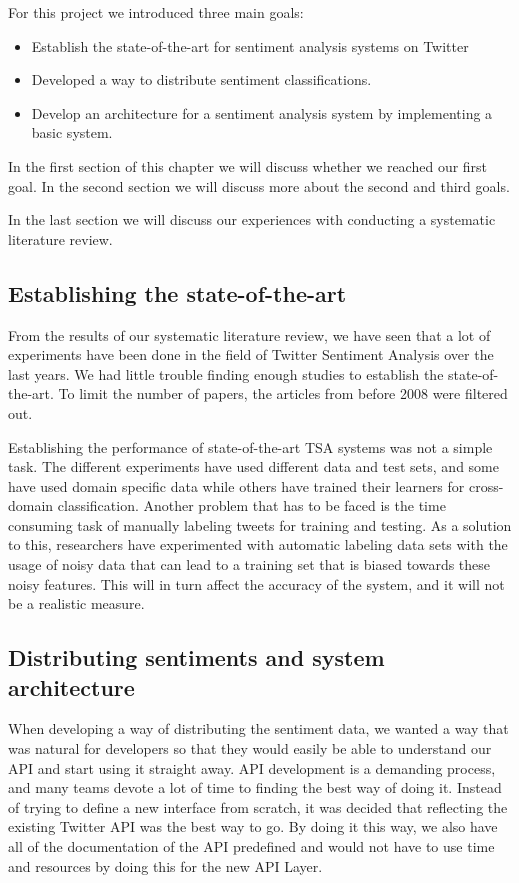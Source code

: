 
For this project we introduced three main goals:
\begin{itemize}
\item Establish the state-of-the-art for sentiment analysis systems on Twitter
\item Developed a way to distribute sentiment classifications.
\item Develop an architecture for a sentiment analysis system by implementing a basic system.
\end{itemize}

\noindent In the first section of this chapter we will discuss whether we reached our first goal. In the second section we will discuss more about the second and third goals. 

In the last section we will discuss our experiences with conducting a systematic literature review. 


\subsection{Establishing the state-of-the-art}
From the results of our systematic literature review, we have seen that a lot of experiments have been done in the field of Twitter Sentiment Analysis over the last years. We had little trouble finding enough studies to establish the state-of-the-art. To limit the number of papers, the articles from before 2008 were filtered out.

Establishing the performance of state-of-the-art TSA systems was not a simple task. The different experiments have used different data and test sets, and some have used domain specific data while others have trained their learners for cross-domain classification. Another problem that has to be faced is the time consuming task of manually labeling tweets for training and testing. As a solution to this, researchers have experimented with automatic labeling data sets with the usage of noisy data that can lead to a training set that is biased towards these noisy features. This will in turn affect the accuracy of the system, and it will not be a realistic measure. 

\subsection{Distributing sentiments and system architecture}

When developing a way of distributing the sentiment data, we wanted a way that was natural for developers so that they would easily be able to understand our API and start using it straight away. API development is a demanding process, and many teams devote a lot of time to finding the best way of doing it. Instead of trying to define a new interface from scratch, it was decided that reflecting the existing Twitter API was the best way to go. By doing it this way, we also have all of the documentation of the API predefined and would not have to use time and resources by doing this for the new API Layer. 

